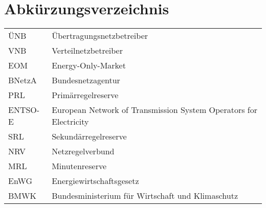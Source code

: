 \section*{Abkürzungsverzeichnis}
%
%	
	\begin{tabulary}{\textwidth}{lL}
		ÜNB & Übertragungsnetzbetreiber \\
		VNB & Verteilnetzbetreiber \\
		EOM & Energy-Only-Market \\
		BNetzA & Bundesnetzagentur \\
		PRL & Primärregelreserve \\
		ENTSO-E & European Network of Transmission System Operators for Electricity \\
		SRL & Sekundärregelreserve \\
		NRV & Netzregelverbund \\
		MRL & Minutenreserve \\
		EnWG & Energiewirtschaftsgesetz \\
		BMWK & Bundesministerium für Wirtschaft und Klimaschutz		
	\end{tabulary} \clearpage

	
